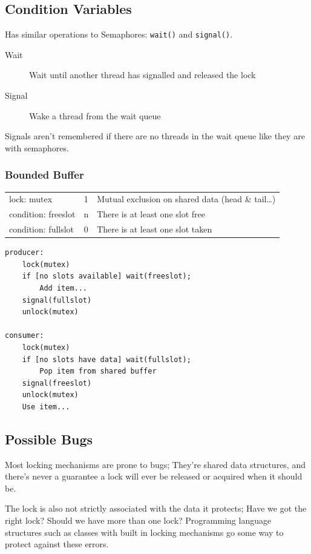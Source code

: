 \documentclass[a4]{article}
\begin{document}
\subsection{Condition Variables}

Has similar operations to Semaphores: \texttt{wait()} and \texttt{signal()}.

\begin{description}
  \item[Wait] Wait until another thread has signalled and released the lock
  \item[Signal] Wake a thread from the wait queue
\end{description}

Signals aren't remembered if there are no threads in the wait queue like they are with semaphores.

\subsubsection{Bounded Buffer}


\begin{tabular}{l | c | l }
lock:      mutex    & 1 & Mutual exclusion on shared data (head \& tail\ldots{})\\
condition: freeslot & n & There is at least one slot free\\
condition: fullslot & 0 & There is at least one slot taken
\end{tabular}

\begin{verbatim}
producer:
    lock(mutex)
    if [no slots available] wait(freeslot);
        Add item...
    signal(fullslot)
    unlock(mutex)

consumer:
    lock(mutex)
    if [no slots have data] wait(fullslot);
        Pop item from shared buffer
    signal(freeslot)
    unlock(mutex)
    Use item...
\end{verbatim}

\subsection{Possible Bugs}

Most locking mechanisms are prone to bugs; They're shared data structures, and there's never a
guarantee a lock will ever be released or acquired when it should be.

The lock is also not strictly associated with the data it protects; Have we got the right lock? 
Should we have more than one lock? Programming language structures
such as classes with built in locking mechanisms go some way to protect against these errors.
\end{document}
